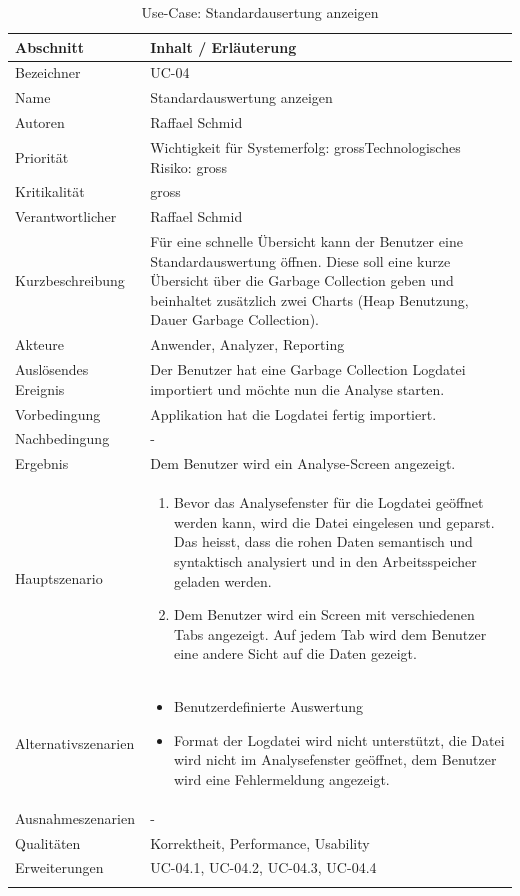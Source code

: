 \begin{longtable}{|p{4cm}|p{10.5cm}|}
\hline
   \textbf{Abschnitt} & \textbf{Inhalt / Erläuterung} \\\hline
   Bezeichner & UC-04\\\hline
   Name & Standardauswertung anzeigen\\\hline
   Autoren & Raffael Schmid\\\hline
   Priorität & Wichtigkeit für Systemerfolg: gross\newline Technologisches Risiko: gross\\\hline
   Kritikalität & gross\\\hline
   Verantwortlicher & Raffael Schmid\\\hline
   Kurzbeschreibung & Für eine schnelle Übersicht kann der Benutzer eine Standardauswertung öffnen. Diese soll eine kurze Übersicht über die Garbage Collection geben und beinhaltet zusätzlich zwei Charts (Heap Benutzung, Dauer Garbage Collection). \\\hline
   Akteure & Anwender, Analyzer, Reporting\\\hline
   Auslösendes Ereignis & Der Benutzer hat eine Garbage Collection Logdatei importiert und möchte nun die Analyse starten.\\\hline
   Vorbedingung & Applikation hat die Logdatei fertig importiert.\\\hline
   Nachbedingung & -\\\hline
   Ergebnis & Dem Benutzer wird ein Analyse-Screen angezeigt.\\\hline
   Hauptszenario & 
	\begin{enumerate}
		\item Bevor das Analysefenster für die Logdatei geöffnet werden kann, wird die Datei eingelesen und geparst. Das heisst, dass die rohen Daten semantisch und syntaktisch analysiert und in den Arbeitsspeicher geladen werden.
		\item Dem Benutzer wird ein Screen mit verschiedenen Tabs angezeigt. Auf jedem Tab wird dem Benutzer eine andere Sicht auf die Daten gezeigt.
	\end{enumerate}
	\\\hline
   Alternativszenarien & 
\begin{itemize}
\item Benutzerdefinierte Auswertung
\item Format der Logdatei wird nicht unterstützt, die Datei wird nicht im Analysefenster geöffnet, dem Benutzer wird eine Fehlermeldung angezeigt.
\end{itemize}\\\hline
   Ausnahmeszenarien & -\\\hline
   Qualitäten &  Korrektheit, Performance, Usability\\\hline
   Erweiterungen & UC-04.1, UC-04.2, UC-04.3, UC-04.4 \\\hline
\caption{Use-Case: Standardausertung anzeigen}
\end{longtable}

